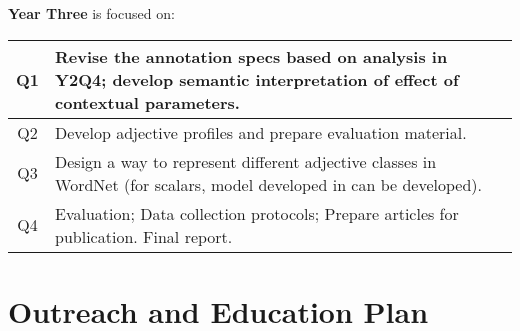 \documentclass[10pt]{article}
\newcommand{\miniskip}{\vspace*{1mm}}
\begin{document}

\miniskip\noindent
{\bf Year Three} is focused on:  

\vspace{2mm}\noindent
{\small
\begin{tabularx}{470pt}{|c|X|}

\hline

Q1 & Revise the annotation specs based on analysis in Y2Q4; develop semantic interpretation of effect of contextual parameters. 
\\

\hline

Q2 &  Develop adjective profiles and prepare evaluation material. \\ %

\hline

Q3 &   Design a way to represent different adjective classes  in WordNet (for scalars, model developed in \cite{sheinmanetal2013} can be developed). \\

\hline

Q4 &  Evaluation; Data collection protocols; Prepare articles for publication.  Final report.\\

\hline

\end{tabularx}
}



\vspace {-4mm}
\section{Outreach and Education Plan}

\vspace {-3mm}

\end{document}
